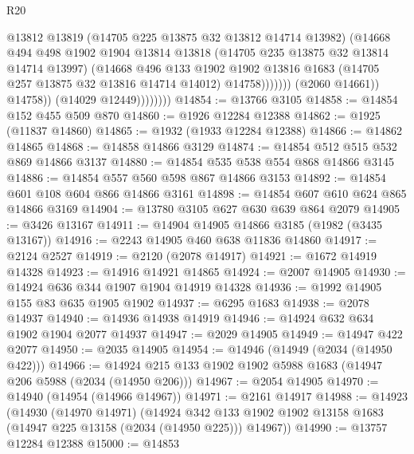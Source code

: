\begin{lexlean}{R20}
\begin{coremodule}
                                  @13812
                                  @13819
                                  (@14705 @225 @13875 @32 @13812 @14714 @13982)
                                  (@14668
                                    @494
                                    @498
                                    @1902
                                    @1904
                                    @13814
                                    @13818
                                    (@14705 @235 @13875 @32 @13814 @14714 @13997)
                                    (@14668
                                      @496
                                      @133
                                      @1902
                                      @1902
                                      @13816
                                      @1683
                                      (@14705 @257 @13875 @32 @13816 @14714 @14012)
                                      @14758)))))))
                        (@2060 @14661))
                      @14758))
                  (@14029 @12449))))))))
@14854 := @13766 @3105
@14858 := @14854 @152 @455 @509 @870
@14860 := @1926 @12284 @12388
@14862 := @1925 (@11837 @14860)
@14865 := @1932 (@1933 @12284 @12388)
@14866 := @14862 @14865
@14868 := @14858 @14866 @3129
@14874 := @14854 @512 @515 @532 @869 @14866 @3137
@14880 := @14854 @535 @538 @554 @868 @14866 @3145
@14886 := @14854 @557 @560 @598 @867 @14866 @3153
@14892 := @14854 @601 @108 @604 @866 @14866 @3161
@14898 := @14854 @607 @610 @624 @865 @14866 @3169
@14904 := @13780 @3105 @627 @630 @639 @864 @2079
@14905 := @3426 @13167
@14911 := @14904 @14905 @14866 @3185 (@1982 (@3435 @13167))
@14916 := @2243 @14905 @460 @638 @11836 @14860
@14917 := @2124 @2527
@14919 := @2120 (@2078 @14917)
@14921 := @1672 @14919 @14328
@14923 := @14916 @14921 @14865
@14924 := @2007 @14905
@14930 := @14924 @636 @344 @1907 @1904 @14919 @14328
@14936 := @1992 @14905 @155 @83 @635 @1905 @1902
@14937 := @6295 @1683
@14938 := @2078 @14937
@14940 := @14936 @14938 @14919
@14946 := @14924 @632 @634 @1902 @1904 @2077 @14937
@14947 := @2029 @14905
@14949 := @14947 @422 @2077
@14950 := @2035 @14905
@14954 := @14946 (@14949 (@2034 (@14950 @422)))
@14966 := @14924 @215 @133 @1902 @1902 @5988 @1683 (@14947 @206 @5988 (@2034 (@14950 @206)))
@14967 := @2054 @14905
@14970 := @14940 (@14954 (@14966 @14967))
@14971 := @2161 @14917
@14988 := @14923
    (@14930
      (@14970 @14971)
      (@14924 @342 @133 @1902 @1902 @13158 @1683 (@14947 @225 @13158 (@2034 (@14950 @225))) @14967))
@14990 := @13757 @12284 @12388
@15000 := @14853

\end{coremodule}
\end{lexlean}
